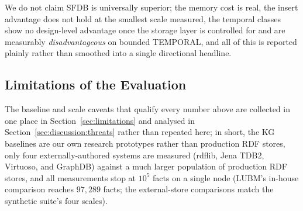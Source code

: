 We do not claim SFDB is universally superior; the memory cost is real,
the insert advantage does not hold at the smallest scale measured, the
temporal classes show no
design-level advantage once the storage
layer is controlled for and are measurably \emph{disadvantageous} on bounded
TEMPORAL, and all of this is reported plainly rather than smoothed into a
single directional headline.

\subsection{Limitations of the Evaluation}
\label{sec:eval:limitations}

The baseline and scale caveats that qualify every number above are
collected in one place in Section~\ref{sec:limitations} and analysed in
Section~\ref{sec:discussion:threats} rather than repeated here; in short,
the KG baselines are our own research prototypes rather than production
RDF stores, only four externally-authored systems are measured (rdflib,
Jena TDB2, Virtuoso, and GraphDB) against a much larger population of
production RDF stores, and all measurements stop at $10^5$ facts on a
single node (LUBM's in-house comparison reaches $97{,}289$ facts; the
external-store comparisons match the synthetic suite's four scales).
